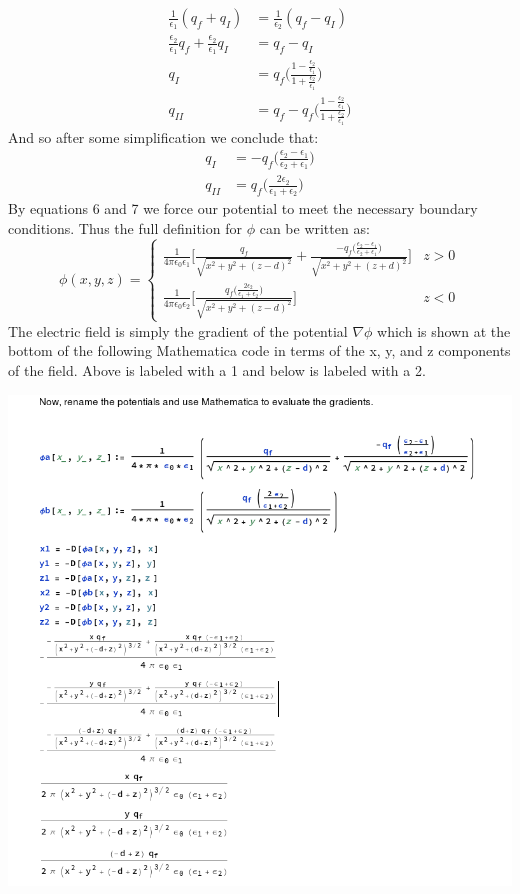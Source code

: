 \documentclass[a4paper, 11pt]{article}
\begin{document}
	\begin{align*}
		\frac{1}{\epsilon_1}(q_f+q_I) &= \frac{1}{\epsilon_2}(q_f - q_I) \\ 
		\frac{\epsilon_2}{\epsilon_1}q_f + \frac{\epsilon_2}{\epsilon_1}q_I &= q_f - q_I \\ 
		q_I &= q_f \Bigg( \frac{1-\frac{\epsilon_2}{\epsilon_1}}{1+\frac{\epsilon_2}{\epsilon_1}}\Bigg) \\
		q_{II} &= q_f - q_f \Bigg( \frac{1-\frac{\epsilon_2}{\epsilon_1}}{1+\frac{\epsilon_2}{\epsilon_1}}\Bigg)
	\end{align*}
And so after some simplification we conclude that: 
	\begin{align}
		q_I &= -q_f \Bigg( \frac{\epsilon_2-\epsilon_1}{\epsilon_2+\epsilon_1}\Bigg) \\ 
		q_{II} &= q_f \Bigg( \frac{2\epsilon_2}{\epsilon_1+\epsilon_2} \Bigg)
	\end{align}
By equations 6 and 7 we force our potential to meet the necessary boundary conditions. Thus the full definition for $\phi$ can be written as: 
	\begin{equation}
		\phi(x,y,z) = 
		\begin{cases}
			\frac{1}{4\pi\epsilon_0\epsilon_1}\Bigg[ \frac{q_f}{\sqrt{x^2+y^2+(z-d)^2}}+ \frac{-q_f\Big( \frac{\epsilon_2-\epsilon_1}{\epsilon_2+\epsilon_1}\Big)}{\sqrt{x^2+y^2+(z+d)^2}}\Bigg] & z > 0 \\ 
			\frac{1}{4\pi\epsilon_0\epsilon_2}\Bigg[ \frac{q_f\Big(\frac{2\epsilon_2}{\epsilon_1+\epsilon_2}\Big)}{\sqrt{x^2+y^2+(z-d)^2}}\Bigg] & z<0
		\end{cases}
	\end{equation}
The electric field is simply the gradient of the potential $\nabla \phi$ which is shown at the bottom of the following Mathematica code in terms of the x, y, and z components of the field. Above is labeled with a 1 and below is labeled with a 2. 
	\begin{center}
		\includegraphics[scale=.69]{code2}
	\end{center}
	
\end{document}
